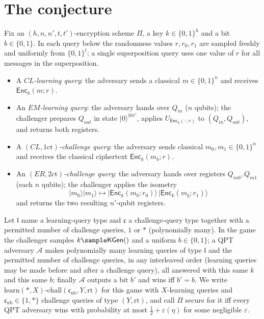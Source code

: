 \documentclass{conjura-conjecture}
\newcommand{\KGen}{\mathsf{KGen}}
\newcommand{\Enc}{\mathsf{Enc}}
\newcommand{\onect}{1\mathrm{ct}}
\newcommand{\twoct}{2\mathrm{ct}}
\newcommand{\learn}{\mathrm{learn}}
\newcommand{\chall}{\mathrm{chall}}
\newcommand{\cnb}{\mathfrak{c}_{\mathrm{nb}}}
\newcommand{\ket}[1]{|#1\rangle}
\begin{document}
\section{The conjecture}\label{sec:conjectures}

\begin{definition}\label{def:queries}
Fix an $(h,n,n',t,t')$-encryption scheme $\Pi$, a key
$k\in\{0,1\}^{h}$ and a bit $b\in\{0,1\}$. In each query below the
randomness values $r,r_0,r_1$ are sampled freshly and uniformly from
$\{0,1\}^{t}$; a single superposition query uses one value of $r$ for
all messages in the superposition.
\begin{itemize}
  \item A \emph{$CL$-learning query}: the adversary sends a classical
    $m\in\{0,1\}^{n}$ and receives $\Enc_k(m;r)$.
  \item An \emph{$EM$-learning query}: the adversary hands over
    $Q_{in}$ ($n$ qubits); the challenger prepares $Q_{out}$ in state
    $\ket{0}^{\otimes n'}$, applies $U_{\Enc_k(\cdot\,;r)}$ to
    $(Q_{in},Q_{out})$, and returns both registers.
  \item A \emph{$(CL,\onect)$-challenge query}: the adversary sends
    classical $m_0,m_1\in\{0,1\}^{n}$ and receives the classical
    ciphertext $\Enc_k(m_b;r)$.
  \item An \emph{$(ER,\twoct)$-challenge query}: the adversary hands
    over registers $Q_{in0},Q_{in1}$ (each $n$ qubits); the challenger
    applies the isometry
    \[
      \ket{m_0}\ket{m_1}\mapsto
      \ket{\Enc_k(m_b;r_0)}\,\ket{\Enc_k(m_{\bar b};r_1)}
    \]
    and returns the two resulting $n'$-qubit registers.
\end{itemize}
\end{definition}

\begin{definition}\label{def:indcpa}
Let $\mathfrak{l}$ name a learning-query type and $\mathfrak{c}$ a
challenge-query type together with a permitted number of challenge
queries, $1$ or $*$ (polynomially many). In the game the challenger
samples $k\sample\KGen()$ and a uniform $b\in\{0,1\}$; a QPT adversary
$\mathcal{A}$ makes polynomially many learning queries of type
$\mathfrak{l}$ and the permitted number of challenge queries, in any
interleaved order (learning queries may be made before and after a
challenge query), all answered with this same $k$ and this same $b$;
finally $\mathcal{A}$ outputs a bit $b'$ and wins iff $b'=b$. We write
$\learn(*,X)$-$\chall(\cnb,Y,\mathrm{rt})$ for this game with
$X$-learning queries and $\cnb\in\{1,*\}$ challenge queries of type
$(Y,\mathrm{rt})$, and call $\Pi$ secure for it iff every QPT adversary
wins with probability at most $\tfrac12+\varepsilon(\eta)$ for some
negligible $\varepsilon$.
\end{definition}
\end{document}
